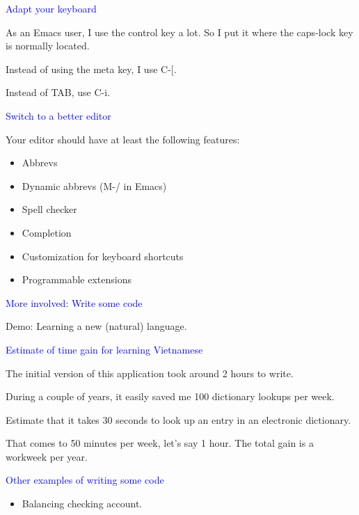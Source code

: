 \documentclass{slides}
\newcommand{\ti}[1]{\begin{center}\Large{\textcolor{blue}{#1}}\end{center}}
\begin{document}
\begin{slide}\ti{Adapt your keyboard}

As an Emacs user, I use the control key a lot.  So I put it where the
caps-lock key is normally located.  

Instead of using the meta key, I use C-[.

Instead of TAB, use C-i.

\vfill\end{slide}
\begin{slide}\ti{Switch to a better editor}

Your editor should have at least the following features:

\begin{itemize}
\item Abbrevs
\item Dynamic abbrevs (M-/ in Emacs)
\item Spell checker
\item Completion
\item Customization for keyboard shortcuts
\item Programmable extensions
\end{itemize}


\vfill\end{slide}
\begin{slide}\ti{More involved: Write some code}

Demo: Learning a new (natural) language.

\vfill\end{slide}
\begin{slide}\ti{Estimate of time gain for learning Vietnamese}

The initial version of this application took around 2 hours to write.

During a couple of years, it easily saved me 100 dictionary lookups
per week.  

Estimate that it takes 30 seconds to look up an entry in an electronic
dictionary.

That comes to 50 minutes per week, let's say 1 hour.  The total gain
is a workweek per year.

\vfill\end{slide}
\begin{slide}\ti{Other examples of writing some code}

  \begin{itemize}
  \item Balancing checking account.
  \end{itemize}

\vfill\end{slide}
\end{document}
